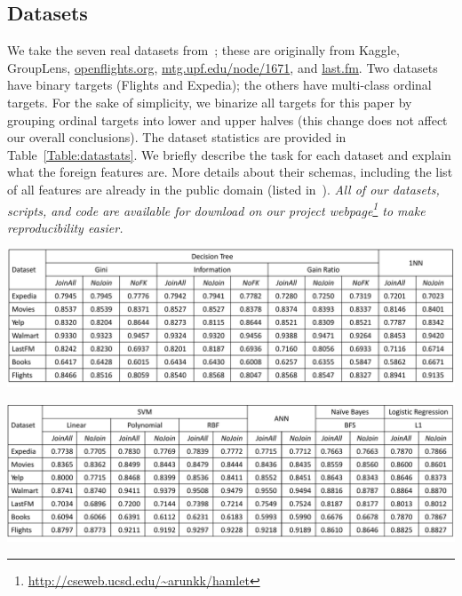 \documentclass{vldb}
\begin{document}
\subsection{Datasets}
We take the seven real datasets from~\cite{hamlet}; these are originally from Kaggle, GroupLens, \url{openflights.org}, \url{mtg.upf.edu/node/1671}, and \url{last.fm}.
Two datasets have binary targets (Flights and Expedia); the others have multi-class ordinal targets. For the sake of simplicity, we binarize all targets 
for this paper by grouping ordinal targets into lower and upper halves (this change does not affect our overall conclusions). 
The dataset statistics are provided in Table~\ref{Table:datastats}. 
We briefly describe the task for each dataset and explain what the foreign features are. More details about their schemas, including the list 
of all features are already in the public domain (listed in~\cite{hamlet}). 
\textit{All of our datasets, scripts, and code are available for download on our project webpage\footnote{\url{http://cseweb.ucsd.edu/~arunkk/hamlet}} 
to make reproducibility easier.}


\begin{table}[t]
\centering
\includegraphics[width=0.99\linewidth]{table2-1.pdf}
\caption{Holdout test accuracy on the real-world datasets for the decision trees and 1-NN.}
\label{Table:RealTest1}
\end{table}

\begin{table}[t]
\centering
\includegraphics[width=0.99\linewidth]{table2-2.pdf}
\caption{Holdout test accuracy on the real-world datasets for the SVMs, ANN, and linear models.}
\label{Table:RealTest2}
\end{table}
\end{document}
